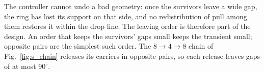 The controller cannot undo a bad geometry: once the survivors leave a wide gap, the ring has lost its support on that
side, and no redistribution of pull among them restores it within the drop line. The leaving order is therefore part
of the design. An order that keeps the survivors' gaps small keeps the transient small; opposite pairs are the simplest
such order. The $8\to4\to8$ chain of Fig.~\ref{fig:s_chain} releases its carriers in opposite pairs, so each release
leaves gaps of at most 90$^\circ$.
